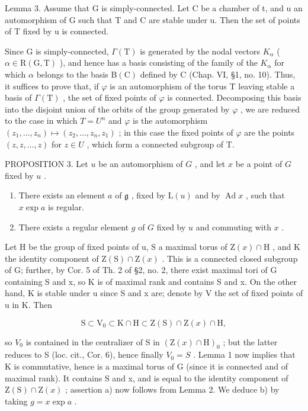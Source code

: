 Lemma 3. Assume that G is simply-connected. Let C be a chamber of t, and u an automorphism of G such that T and C are stable under u. Then the set of points of T fixed by u is connected.

Since G is simply-connected, \(\varGamma(\mathrm{T})\) is generated by the nodal vectors \(K_{\alpha}\) ( \(\alpha \in \mathrm{R}(\mathrm{G}, \mathrm{T})\) ), and hence has a basis consisting of the family of the \(K_{\alpha}\) for which \(\alpha\) belongs to the basis \(\mathrm{B}(\mathrm{C})\) defined by C (Chap. VI, §1, no. 10). Thus, it suffices to prove that, if \(\varphi\) is an automorphism of the torus T leaving stable a basis of \(\varGamma(\mathrm{T})\) , the set of fixed points of \(\varphi\) is connected. Decomposing this basis into the disjoint union of the orbits of the group generated by \(\varphi\) , we are reduced to the case in which \(T = U^{n}\) and \(\varphi\) is the automorphism \((z_{1}, \ldots, z_{n}) \mapsto (z_{2}, \ldots, z_{n}, z_{1})\) ; in this case the fixed points of \(\varphi\) are the points \((z, z, \ldots, z)\) for \(z \in U\) , which form a connected subgroup of T.

PROPOSITION 3. Let \(u\) be an automorphism of \(G\) , and let \(x\) be a point of \(G\) fixed by \(u\) .

\begin{enumerate}
\def\labelenumi{\alph{enumi})}
\item
  There exists an element \(a\) of \(\mathfrak{g}\) , fixed by \(\mathrm{L}(u)\) and by \(\operatorname{Ad} x\) , such that \(x \exp a\) is regular.
\item
  There exists a regular element \(g\) of \(G\) fixed by \(u\) and commuting with \(x\) .
\end{enumerate}

Let H be the group of fixed points of u, S a maximal torus of \(\mathrm{Z}(x)\cap\mathrm{H}\) , and K the identity component of \(\mathrm{Z}(\mathrm{S})\cap\mathrm{Z}(x)\) . This is a connected closed subgroup of G; further, by Cor. 5 of Th. 2 of §2, no. 2, there exist maximal tori of G containing S and x, so K is of maximal rank and contains S and x. On the other hand, K is stable under u since S and x are; denote by V the set of fixed points of u in K. Then

\[
\mathrm{S} \subset \mathrm{V} _ {0} \subset \mathrm{K} \cap \mathrm{H} \subset \mathrm{Z} (\mathrm{S}) \cap \mathrm{Z} (x) \cap \mathrm{H},
\]

so \(V_{0}\) is contained in the centralizer of S in \((\mathrm{Z}(x)\cap\mathrm{H})_{0}\) ; but the latter reduces to S (loc. cit., Cor. 6), hence finally \(V_{0}=S\) . Lemma 1 now implies that K is commutative, hence is a maximal torus of G (since it is connected and of maximal rank). It contains S and x, and is equal to the identity component of \(\mathrm{Z}(\mathrm{S})\cap\mathrm{Z}(x)\) ; assertion a) now follows from Lemma 2. We deduce b) by taking \(g=x\exp a\) .

